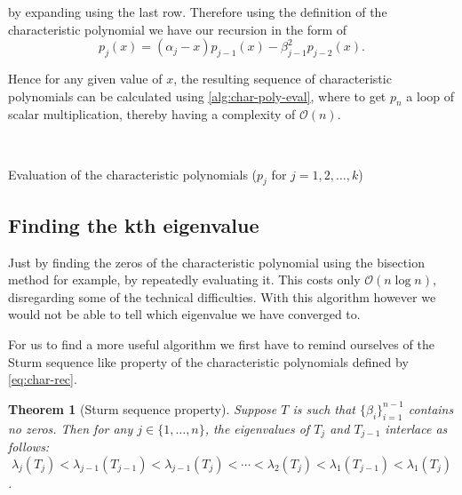 \documentclass{article}
\newtheorem{theorem}{Theorem}
\begin{document}
by expanding using the last row. Therefore using the definition of the characteristic polynomial we have our recursion in the form of 
\begin{equation}\label{eq:char-rec}
	p_j(x) = (\alpha_j - x)p_{j-1} (x) - \beta_{j-1}^2
	p_{j-2}(x).
\end{equation}

Hence for any given value of $x$, the resulting sequence of characteristic polynomials can be calculated using \autoref{alg:char-poly-eval}, where to get $p_n$ a loop of scalar multiplication, thereby having a complexity of $\mathcal{O}(n)$.

\begin{algorithm2e}[ht]
	
	\SetAlgoLined
	\\
	\caption{Evaluation of the characteristic polynomials ($p_j$ for $j=1,2,\dots,k$)}\label{alg:char-poly-eval}
\end{algorithm2e}

\subsection{Finding the kth eigenvalue}

Just by finding the zeros of the characteristic polynomial using the bisection method for example, by repeatedly evaluating it. This costs only $\mathcal{O}(n\log{n})$, disregarding some of the technical difficulties. With this algorithm however we would not be able to tell which eigenvalue we have converged to. 

For us to find a more useful algorithm we first have to remind ourselves of the Sturm sequence like property of the characteristic polynomials defined by
 \autoref{eq:char-rec}.
 \begin{theorem}[Sturm sequence property]
 	Suppose $T$ is such that $\{\beta_i\}_{i=1}^{n-1}$ contains no zeros. Then for any $j \in \{1,\ldots,n\}$, the eigenvalues of $T_j$ and $T_{j-1}$ interlace as follows:
 	$$\lambda_j(T_j) <\lambda_{j-1}(T_{j-1}) < \lambda_{j-1}(T_j) <\cdots< \lambda_2(T_j) <\lambda_1(T_{j-1}) < \lambda_1(T_j)$$.
 \end{theorem}
 
\end{document}
